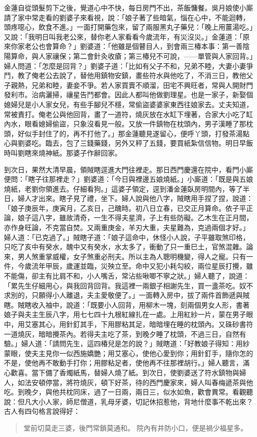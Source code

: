金蓮自從頭髮剪下之後，覺道心中不快，每日房門不出，茶飯慵餐。吳月娘使小廝請了家中常走看的劉婆子來看視，說：「娘子著了些暗氣，惱在心中，不能迴轉，頭疼噁心，飲食不進。」一面打開藥包來，留了兩服黑丸子藥兒：「晚上用薑湯吃。」又說：「我明日叫我老公來，替你老人家看看今歲流年，有災沒災。」金蓮道：「原來你家老公也會算命？」劉婆道：「他雖是個瞽目人，到會兩三椿本事：第一善陰陽算命，與人家禳保；第二會針灸收瘡；第三椿兒不可說，——單管與人家回背。」婦人問道：「怎麼是回背？」劉婆子道：「比如有父子不和，兄弟不睦，大妻小妻爭鬥，教了俺老公去說了，替他用鎮物安鎮，畫些符水與他吃了，不消三日，教他父子親熱，兄弟和睦，妻妾不爭。若人家買賣不順溜，田宅不興旺者，常與人開財門發利市。治病灑掃，禳星告鬥都會。因此人都叫他做劉理星。也是一家子，新娶個媳婦兒是小人家女兒，有些手腳兒不穩，常偷盜婆婆家東西往娘家去。丈夫知道，常被責打。俺老公與他回背，畫了一道符，燒灰放在水缸下埋著，合家大小吃了缸內水，眼看媳婦偷盜，只象沒看見一般。又放一件鎮物在枕頭內，男子漢睡了那枕頭，好似手封住了的，再不打他了。」那金蓮聽見遂留心，便呼丫頭，打發茶湯點心與劉婆吃。臨去，包了三錢藥錢，另外又秤了五錢，要買紙紮信信物。明日早飯時叫劉瞎來燒神紙。那婆子作辭回家。

到次日，果然大清早晨，領賊瞎逕進大門往裡走。那日西門慶還在院中，看門小廝便問：「瞎子往那裡走？」劉婆道：「今日與裡邊五娘燒紙。」小廝道：「既是與五娘燒紙，老劉你領進去。仔細看狗。」這婆子領定，逕到潘金蓮臥房明間內，等了半日，婦人才出來。瞎子見了禮，坐下。婦人說與他八字，賊瞎用手捏了捏，說道：「娘子庚辰年，庚寅月，乙亥日，己醜時。初八日立春，已交正月算命。依子平正論，娘子這八字，雖故清奇，一生不得夫星濟，子上有些防礙。乙木生在正月間，亦作身旺論，不克當自焚。又兩重庚金，羊刃大重，夫星難為，克過兩個才好。」婦人道：「已克過了。」賊瞎子道：「娘子這命中，休怪小人說，子平雖取煞印格，只吃了亥中有癸水，醜中又有癸水，水太多了，衝動了只一重巳土，官煞混雜。論來，男人煞重掌威權，女子煞重必刑夫。所以主為人聰明機變，得人之寵。只有一件，今歲流年甲辰，歲運並臨，災殃立至。命中又犯小耗勾絞，兩位星辰打攪，雖不能傷，卻主有比肩不和，小人嘴舌，常沾些啾唧不寧之狀。」婦人聽了，說道：「累先生仔細用心，與我回背回背。我這裡一兩銀子相謝先生，買一盞茶吃。奴不求別的，只願得小人離退，夫主愛敬便了。」一面轉入房中，拔了兩件首飾遞與賊瞎。賊瞎收入袖中，說道：「既要小人回背，用柳木一塊，刻兩個男女人形，書著娘子與夫主生辰八字，用七七四十九根紅線扎在一處。上用紅紗一片，蒙在男子眼中，用艾塞其心，用針釘其手，下用膠粘其足，暗暗埋在睡的枕頭內。又硃砂書符一道燒灰，暗暗攪茶內。若得夫主吃了茶，到晚夕睡了枕頭，不過三日，自然有驗。」婦人道：「請問先生，這四椿兒是怎的說？」賊瞎道：「好教娘子得知：用紗蒙眼，使夫主見你一似西施嬌艷；用艾塞心，使他心愛到你；用針釘手，隨你怎的不是，使他再不敢動手打你；用膠粘足者，使他再不往那裡胡行。」婦人聽言，滿心歡喜。當下備了香燭紙馬，替婦人燒了紙。到次日，使劉婆送了符水鎮物與婦人，如法安頓停當，將符燒灰，頓下好茶，待的西門慶家來，婦人叫春梅遞茶與他吃。到晚夕，與他共枕同床，過了一日兩，兩日三，似水如魚，歡會異常。看觀聽說：但凡大小人家，師尼僧道，乳母牙婆，切記休招惹他，背地什麼事不乾出來？古人有四句格言說得好：
\begin{quote}
堂前切莫走三婆，後門常鎖莫通和。
院內有井防小口，便是禍少福星多。
\end{quote}
